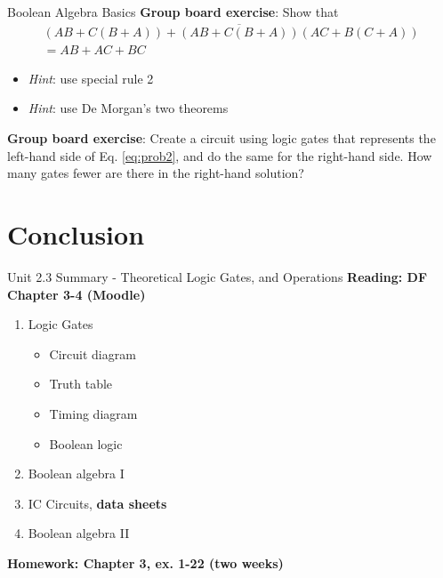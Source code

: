 \documentclass{beamer}
\begin{document}
\begin{frame}{Boolean Algebra Basics}
\small
\textbf{Group board exercise}: Show that
\begin{equation}
\boxed{
\begin{multlined}
(AB+C(B+A))+\overline{(AB+C(B+A))}(AC+B(C+A)) \\ = AB+AC+BC \label{eq:prob2}
\end{multlined}}
\end{equation}
\begin{itemize}
\item \textit{Hint}: use special rule 2
\item \textit{Hint}: use De Morgan's two theorems
\end{itemize}
\textbf{Group board exercise}: Create a circuit using logic gates that represents the left-hand side of Eq. \ref{eq:prob2}, and do the same for the right-hand side.  How many gates fewer are there in the right-hand solution?
\end{frame}

\section{Conclusion}

\begin{frame}{Unit 2.3 Summary - Theoretical Logic Gates, and Operations}
\textbf{Reading: DF Chapter 3-4 (Moodle)}
\begin{enumerate}
\item Logic Gates
\begin{itemize}
\item Circuit diagram
\item Truth table
\item Timing diagram
\item Boolean logic
\end{itemize}
\item \alert{Boolean algebra I}
\item IC Circuits, \textbf{data sheets}
\item \alert{Boolean algebra II}
\end{enumerate}
\textbf{Homework: Chapter 3, ex. 1-22 (two weeks)}
\end{frame}
\end{document}
